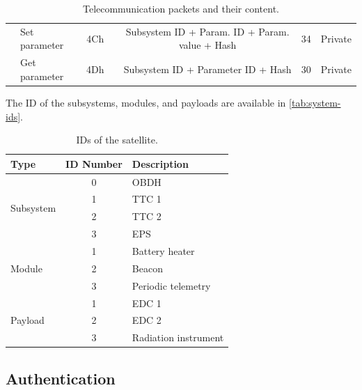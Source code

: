 \begin{landscape}
\begin{table}[ht]
\begin{tabular}{llccccc}
                                      & Set parameter         & 4Ch &                                     & Subsystem ID + Param. ID + Param. value + Hash & 34                    & Private \\
                                      & Get parameter         & 4Dh &                                     & Subsystem ID + Parameter ID + Hash             & 30                    & Private \\
            \bottomrule[1.5pt]
        \end{tabular}
        \caption{Telecommunication packets and their content.}
        \label{tab:packets-struct}
    \end{table}
\end{landscape}

The ID of the subsystems, modules, and payloads are available in \autoref{tab:system-ids}.

\begin{table}[ht]
    \centering
    \begin{tabular}{lcl}
        \toprule[1.5pt]
        \textbf{Type} & \textbf{ID Number} & \textbf{Description} \\
        \midrule
        \multirow{4}{*}{Subsystem} & 0 & OBDH \\
                                   & 1 & TTC 1 \\
                                   & 2 & TTC 2 \\
                                   & 3 & EPS \\
        \midrule
        \multirow{3}{*}{Module}    & 1 & Battery heater \\
                                   & 2 & Beacon \\
                                   & 3 & Periodic telemetry \\
        \midrule
        \multirow{4}{*}{Payload}   & 1 & EDC 1 \\
                                   & 2 & EDC 2 \\
                                   & 3 & Radiation instrument \\
        \bottomrule[1.5pt]
    \end{tabular}
    \caption{IDs of the satellite.}
    \label{tab:system-ids}
\end{table}

\subsection{Authentication}

